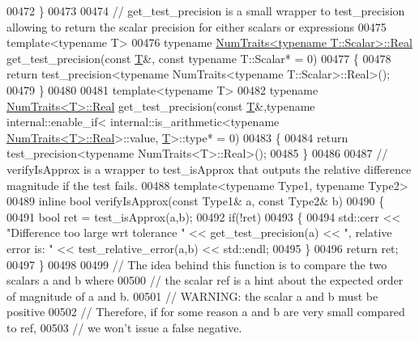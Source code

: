 \begin{DoxyCode}
00472 \}
00473 
00474 \textcolor{comment}{// get\_test\_precision is a small wrapper to test\_precision allowing to return the scalar precision for
       either scalars or expressions}
00475 \textcolor{keyword}{template}<\textcolor{keyword}{typename} T>
00476 \textcolor{keyword}{typename} \hyperlink{group___core___module_struct_eigen_1_1_num_traits}{NumTraits<typename T::Scalar>::Real} get\_test\_precision(\textcolor{keyword}{const} 
      \hyperlink{group___sparse_core___module}{T}&, \textcolor{keyword}{const} \textcolor{keyword}{typename} T::Scalar* = 0)
00477 \{
00478   \textcolor{keywordflow}{return} test\_precision<typename NumTraits<typename T::Scalar>::Real>();
00479 \}
00480 
00481 \textcolor{keyword}{template}<\textcolor{keyword}{typename} T>
00482 \textcolor{keyword}{typename} \hyperlink{group___core___module_struct_eigen_1_1_num_traits}{NumTraits<T>::Real} get\_test\_precision(\textcolor{keyword}{const} \hyperlink{group___sparse_core___module}{T}&,\textcolor{keyword}{typename} internal::enable\_if<
      internal::is\_arithmetic<\textcolor{keyword}{typename} \hyperlink{group___core___module_struct_eigen_1_1_num_traits}{NumTraits<T>::Real}>::value, \hyperlink{group___sparse_core___module}{T}>::type* = 0)
00483 \{
00484   \textcolor{keywordflow}{return} test\_precision<typename NumTraits<T>::Real>();
00485 \}
00486 
00487 \textcolor{comment}{// verifyIsApprox is a wrapper to test\_isApprox that outputs the relative difference magnitude if the test
       fails.}
00488 \textcolor{keyword}{template}<\textcolor{keyword}{typename} Type1, \textcolor{keyword}{typename} Type2>
00489 \textcolor{keyword}{inline} \textcolor{keywordtype}{bool} verifyIsApprox(\textcolor{keyword}{const} Type1& a, \textcolor{keyword}{const} Type2& b)
00490 \{
00491   \textcolor{keywordtype}{bool} ret = test\_isApprox(a,b);
00492   \textcolor{keywordflow}{if}(!ret)
00493   \{
00494     std::cerr << \textcolor{stringliteral}{"Difference too large wrt tolerance "} << get\_test\_precision(a)  << \textcolor{stringliteral}{", relative error is: "}
       << test\_relative\_error(a,b) << std::endl;
00495   \}
00496   \textcolor{keywordflow}{return} ret;
00497 \}
00498 
00499 \textcolor{comment}{// The idea behind this function is to compare the two scalars a and b where}
00500 \textcolor{comment}{// the scalar ref is a hint about the expected order of magnitude of a and b.}
00501 \textcolor{comment}{// WARNING: the scalar a and b must be positive}
00502 \textcolor{comment}{// Therefore, if for some reason a and b are very small compared to ref,}
00503 \textcolor{comment}{// we won't issue a false negative.}

\end{DoxyCode}
